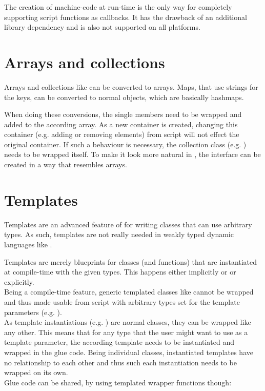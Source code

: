 The creation of machine-code at run-time is the only way for completely supporting script functions as callbacks. It has the drawback of an additional library dependency and is also not supported on all platforms.

\section{Arrays and collections}

Arrays and collections like  can be converted to  arrays. Maps, that use strings for the keys, can be converted to normal  objects, which are basically hashmaps.

When doing these conversions, the single members need to be wrapped and added to the according  array. As a new  container is created, changing this container (e.g. adding or removing elements) from script will not effect the original  container. If such a behaviour is necessary, the collection class (e.g. ) needs to be wrapped itself. To make it look more natural in , the interface can be created in a way that resembles  arrays.

\section{Templates}

Templates are an advanced feature of  for writing classes that can use arbitrary types. As such, templates are not really needed in weakly typed dynamic languages like .

Templates are merely blueprints for classes (and functions) that are instantiated at compile-time with the given types. This happens either implicitly or or explicitly.\\
Being a compile-time feature, generic templated classes like  cannot be wrapped and thus made usable from script with arbitrary types set for the template parameters (e.g. ).\\
As template instantiations (e.g. ) are normal classes, they can be wrapped like any other. This means that for any type that the  user might want to use as a template parameter, the according template needs to be instantiated and wrapped in the glue code. Being individual classes, instantiated templates have no relationship to each other and thus such each instantiation needs to be wrapped on its own.\\
Glue code can be shared, by using templated wrapper functions though: 


